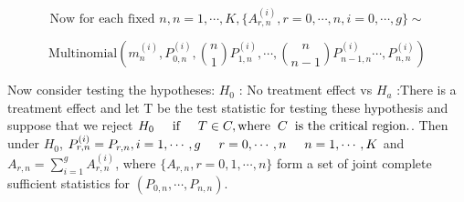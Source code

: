 \documentclass[12pt,oneside]{report}
\theoremstyle{definition}
\theoremstyle{mystyle}
\begin{document}
\begin{equation*}
\text{Now for each fixed } n ,n=1,\cdots,K,\{A_{r,n}^{(i)},r=0,\cdots,n,i=0,\cdots,g\}
 \sim 
\end{equation*}

\begin{equation*}
\text{Multinomial}\left(m^{(i)}_{n},P_{0,n}^{(i)},\binom{n}{1}P_{1,n}^{(i)},
\cdots,\binom{n}{n-1}P_{n-1,n}^{(i)}\cdots,P_{n,n}^{(i)} \right)
\end{equation*}

 


Now consider testing the  hypotheses:
$H_{0}$   :  No treatment effect \hspace{2mm}  vs \hspace{2mm}  $H_{a}$  :\hspace{2mm}There is a treatment effect and
let T be the test statistic for testing these hypothesis and suppose that we reject $H_{0}\hspace{5mm} \text{if} \hspace{5mm}T \in C,\text{where} \hspace{2mm}C\hspace{2mm} \text{is the critical region.}$. Then under $H_{0}$,  $P^{(i)}_{r,n}=P_{r,n},i=1,\cdots,g \hspace{5mm}r=0,\cdots,n \hspace{5mm} n=1,\cdots,K$ and  $A_{r,n}=\sum\limits_{i=1}^{g}A_{r,n}^{(i)}$, where $\{A_{r,n},r=0,1,\cdots,n\}$ form a set of joint complete sufficient statistics for  $\left( P_{0,n},\cdots,P_{n,n} \right)$.

\end{document}
